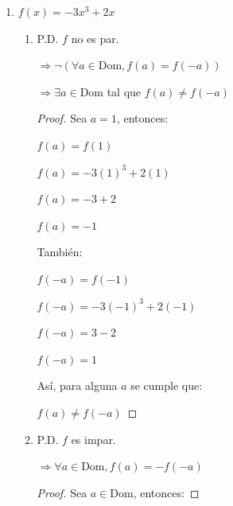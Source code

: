 \documentclass{article}
\begin{document}
\begin{enumerate}
\begin{enumerate}
\begin{enumerate}
\begin{proof}
                \(f(a) \neq -f(-a)\)
                \end{proof}
            \end{enumerate}
            \vspace{\baselineskip}
            
        \item[b)] \(f(x) = -3x^3 + 2x\)
            \begin{enumerate}
                \item[1.] P.D. \(f\) no es par.

                \(\Rightarrow \neg(\forall a \in \text{Dom}, f(a) = f(-a))\)
                
                \(\Rightarrow \exists a \in \text{Dom}\) tal que \(f(a) \neq f(-a)\)
                
                \begin{proof} Sea \(a = 1\), entonces:
                
                \(f(a) = f(1)\)
                
                \(f(a) = -3(1)^3 + 2(1)\)
                
                \(f(a) = -3 + 2\)
                
                \(f(a) = -1\)
                \vspace{\baselineskip}
                
                También:
                
                \(f(-a) = f(-1)\)
                
                \(f(-a) = -3(-1)^3 + 2(-1)\)
                
                \(f(-a) = 3 - 2\)
                
                \(f(-a) = 1\)
                \vspace{\baselineskip}
                
                Así, para alguna \(a\) se cumple que:
                
                \(f(a) \neq f(-a)\)
                \end{proof}
                
                \item[2.] P.D. \(f\) es impar.

                \(\Rightarrow \forall a \in \text{Dom}, f(a) = -f(-a)\)
                
                \begin{proof} Sea \(a \in \text{Dom}\), entonces:
                

\end{proof}
\end{enumerate}
\end{enumerate}
\end{enumerate}
\end{document}
